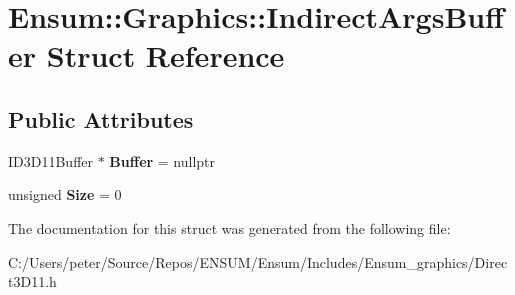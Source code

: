 \hypertarget{struct_ensum_1_1_graphics_1_1_indirect_args_buffer}{}\section{Ensum\+:\+:Graphics\+:\+:Indirect\+Args\+Buffer Struct Reference}
\label{struct_ensum_1_1_graphics_1_1_indirect_args_buffer}
\subsection*{Public Attributes}
\begin{DoxyCompactItemize}
\item 
I\+D3\+D11\+Buffer $\ast$ {\bfseries Buffer} = nullptr\hypertarget{struct_ensum_1_1_graphics_1_1_indirect_args_buffer_a3538f8910f284103d53c74ab46a7e6c7}{}\label{struct_ensum_1_1_graphics_1_1_indirect_args_buffer_a3538f8910f284103d53c74ab46a7e6c7}

\item 
unsigned {\bfseries Size} = 0\hypertarget{struct_ensum_1_1_graphics_1_1_indirect_args_buffer_ae69b1b5c792347d5dae6b060109ff8b6}{}\label{struct_ensum_1_1_graphics_1_1_indirect_args_buffer_ae69b1b5c792347d5dae6b060109ff8b6}

\end{DoxyCompactItemize}


The documentation for this struct was generated from the following file\+:\begin{DoxyCompactItemize}
\item 
C\+:/\+Users/peter/\+Source/\+Repos/\+E\+N\+S\+U\+M/\+Ensum/\+Includes/\+Ensum\+\_\+graphics/Direct3\+D11.\+h\end{DoxyCompactItemize}
